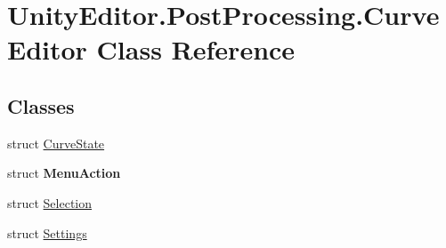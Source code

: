 \hypertarget{class_unity_editor_1_1_post_processing_1_1_curve_editor}{}\section{Unity\+Editor.\+Post\+Processing.\+Curve\+Editor Class Reference}
\label{class_unity_editor_1_1_post_processing_1_1_curve_editor}
\subsection*{Classes}
\begin{DoxyCompactItemize}
\item 
struct \mbox{\hyperlink{struct_unity_editor_1_1_post_processing_1_1_curve_editor_1_1_curve_state}{Curve\+State}}
\item 
struct {\bfseries Menu\+Action}
\item 
struct \mbox{\hyperlink{struct_unity_editor_1_1_post_processing_1_1_curve_editor_1_1_selection}{Selection}}
\item 
struct \mbox{\hyperlink{struct_unity_editor_1_1_post_processing_1_1_curve_editor_1_1_settings}{Settings}}
\end{DoxyCompactItemize}
